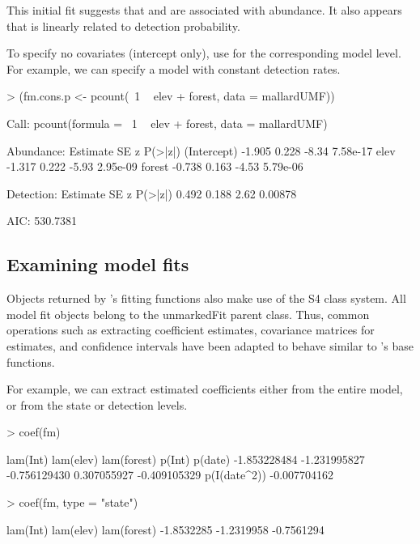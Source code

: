\documentclass[article,shortnames]{jss}
\newcommand{\um}{\pkg{unmarked}}
\newcommand{\rlang}{\proglang{R}}
\begin{document}
This initial fit suggests that  and  are
associated with abundance.  It also appears that  is
linearly related to detection probability.

To specify no covariates (intercept only), use  for the
corresponding model level.  For example, we can specify a model with
constant detection rates.


\begin{Schunk}
\begin{Sinput}
> (fm.cons.p <- pcount(~1 ~ elev + forest, data = mallardUMF))
\end{Sinput}
\begin{Soutput}
Call:
pcount(formula = ~1 ~ elev + forest, data = mallardUMF)

Abundance:
            Estimate    SE     z  P(>|z|)
(Intercept)   -1.905 0.228 -8.34 7.58e-17
elev          -1.317 0.222 -5.93 2.95e-09
forest        -0.738 0.163 -4.53 5.79e-06

Detection:
 Estimate    SE    z P(>|z|)
    0.492 0.188 2.62 0.00878

AIC: 530.7381 
\end{Soutput}
\end{Schunk}

\subsection{Examining model fits}
\label{sec:examining-model-fits}

Objects returned by \um's fitting functions also make use of the S4
class system.  All model fit objects belong to the unmarkedFit parent
class.  Thus, common operations such as extracting coefficient
estimates, covariance matrices for estimates, and confidence intervals
have been adapted to behave similar to \rlang's base functions.


For example, we can extract estimated coefficients either from the
entire model, or from the state or detection levels.

\begin{Schunk}
\begin{Sinput}
> coef(fm)
\end{Sinput}
\begin{Soutput}
    lam(Int)    lam(elev)  lam(forest)       p(Int)      p(date) 
-1.853228484 -1.231995827 -0.756129430  0.307055927 -0.409105329 
p(I(date^2)) 
-0.007704162 
\end{Soutput}
\begin{Sinput}
> coef(fm, type = "state")
\end{Sinput}
\begin{Soutput}
   lam(Int)   lam(elev) lam(forest) 
 -1.8532285  -1.2319958  -0.7561294 
\end{Soutput}
\end{Schunk}
\end{document}
